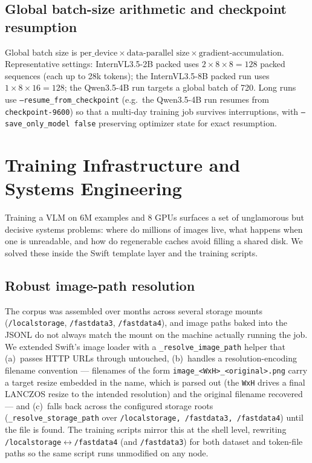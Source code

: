 \documentclass[11pt,a4paper]{article}
\begin{document}
\subsection{Global batch-size arithmetic and checkpoint resumption}
Global batch size is $\text{per\_device} \times \text{data-parallel size} \times \text{gradient-accumulation}$. Representative settings: InternVL3.5-2B packed uses $2 \times 8 \times 8 = 128$ packed sequences (each up to 28k tokens); the InternVL3.5-8B packed run uses $1 \times 8 \times 16 = 128$; the Qwen3.5-4B run targets a global batch of 720. Long runs use \texttt{--resume\_from\_checkpoint} (e.g.\ the Qwen3.5-4B run resumes from \texttt{checkpoint-9600}) so that a multi-day training job survives interruptions, with \texttt{--save\_only\_model false} preserving optimizer state for exact resumption.

\section{Training Infrastructure and Systems Engineering}
\label{sec:infra}

Training a VLM on 6M examples and 8 GPUs surfaces a set of unglamorous but decisive systems problems: where do millions of images live, what happens when one is unreadable, and how do regenerable caches avoid filling a shared disk. We solved these inside the Swift template layer and the training scripts.

\subsection{Robust image-path resolution}
The corpus was assembled over months across several storage mounts (\texttt{/localstorage}, \texttt{/fastdata3}, \texttt{/fastdata4}), and image paths baked into the JSONL do not always match the mount on the machine actually running the job. We extended Swift's image loader with a \texttt{\_resolve\_image\_path} helper that (a)~passes HTTP URLs through untouched, (b)~handles a resolution-encoding filename convention --- filenames of the form \texttt{image\_<WxH>\_<original>.png} carry a target resize embedded in the name, which is parsed out (the \texttt{WxH} drives a final LANCZOS resize to the intended resolution) and the original filename recovered --- and (c)~falls back across the configured storage roots (\texttt{\_resolve\_storage\_path} over \texttt{/localstorage, /fastdata3, /fastdata4}) until the file is found. The training scripts mirror this at the shell level, rewriting \texttt{/localstorage}$\leftrightarrow$\texttt{/fastdata4} (and \texttt{/fastdata3}) for both dataset and token-file paths so the same script runs unmodified on any node.
\end{document}

